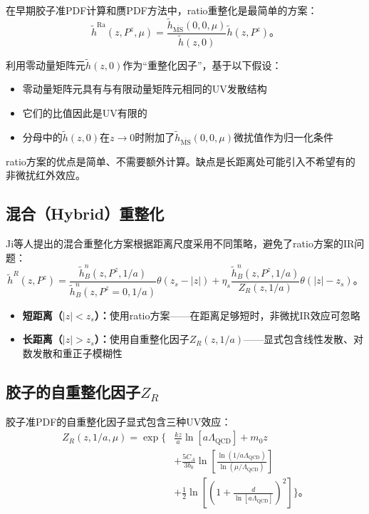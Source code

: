 \documentclass[12pt,a4paper]{ctexart}
\theoremstyle{definition}
\begin{document}
在早期胶子准PDF计算和赝PDF方法中，ratio重整化是最简单的方案\cite{Fan2018gluon,Chen2025gluon}：
\begin{equation}
\tilde{h}^{\text{Ra}}(z, P^z, \mu) = \frac{\tilde{h}_{\overline{\text{MS}}}(0, 0, \mu)}{\tilde{h}(z, 0)} \tilde{h}(z, P^z)。
\label{eq:ratio_renorm}
\end{equation}

利用零动量矩阵元$\tilde{h}(z,0)$作为``重整化因子''，基于以下假设：
\begin{itemize}
    \item 零动量矩阵元具有与有限动量矩阵元相同的UV发散结构
    \item 它们的比值因此是UV有限的
    \item 分母中的$\tilde{h}(z,0)$在$z\to 0$时附加了$\tilde{h}_{\overline{\text{MS}}}(0,0,\mu)$微扰值作为归一化条件
\end{itemize}

ratio方案的优点是简单、不需要额外计算。缺点是长距离处可能引入不希望有的非微扰红外效应\cite{Ji2021hybrid}。

\subsection{混合（Hybrid）重整化}

Ji等人提出的混合重整化方案\cite{Ji2021hybrid}根据距离尺度采用不同策略，避免了ratio方案的IR问题：
\begin{equation}
\boxed{\tilde{h}^R(z, P^z) = \frac{\tilde{h}^n_B(z, P^z, 1/a)}{\tilde{h}^n_B(z, P^z=0, 1/a)} \theta(z_s - |z|) + \eta_s \frac{\tilde{h}^n_B(z, P^z, 1/a)}{Z_R(z, 1/a)} \theta(|z| - z_s)}。
\label{eq:hybrid_renorm}
\end{equation}

\begin{itemize}
    \item \textbf{短距离（$|z| < z_s$）：}使用ratio方案——在距离足够短时，非微扰IR效应可忽略
    \item \textbf{长距离（$|z| > z_s$）：}使用自重整化因子$Z_R(z,1/a)$——显式包含线性发散、对数发散和重正子模糊性
\end{itemize}

\subsection{胶子的自重整化因子$Z_R$}

胶子准PDF的自重整化因子显式包含三种UV效应\cite{Ji2021hybrid,Chen2025gluon}：
\begin{equation}
\boxed{
\begin{aligned}
Z_R(z, 1/a, \mu) = \exp\Bigg\{&\frac{kz}{a}\ln[a\Lambda_{\text{QCD}}] + m_0 z \\
&+ \frac{5C_A}{3b_0} \ln\left[\frac{\ln(1/a\Lambda_{\text{QCD}})}{\ln(\mu/\Lambda_{\text{QCD}})}\right] \\
&+ \frac{1}{2}\ln\left[\left(1 + \frac{d}{\ln[a\Lambda_{\text{QCD}}]}\right)^2\right]\Bigg\}。
\end{aligned}
}
\label{eq:ZR_gluon}
\end{equation}
\end{document}
